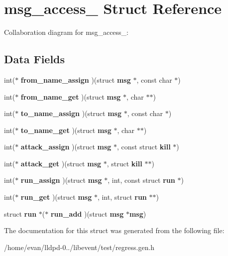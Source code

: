 \section{msg\-\_\-access\-\_\- \-Struct \-Reference}
\label{structmsg__access__}


\-Collaboration diagram for msg\-\_\-access\-\_\-\-:
\subsection*{\-Data \-Fields}
\begin{DoxyCompactItemize}
\item 
int($\ast$ {\bfseries from\-\_\-name\-\_\-assign} )(struct {\bf msg} $\ast$, const char $\ast$)\label{structmsg__access___aab24d16a38b390a7a0224426d52d34a1}

\item 
int($\ast$ {\bfseries from\-\_\-name\-\_\-get} )(struct {\bf msg} $\ast$, char $\ast$$\ast$)\label{structmsg__access___ad7114106088eb845e5763b3dbd6a34c2}

\item 
int($\ast$ {\bfseries to\-\_\-name\-\_\-assign} )(struct {\bf msg} $\ast$, const char $\ast$)\label{structmsg__access___a19536e5d882645bf50e5f5e8e8317e50}

\item 
int($\ast$ {\bfseries to\-\_\-name\-\_\-get} )(struct {\bf msg} $\ast$, char $\ast$$\ast$)\label{structmsg__access___a631ef4a0d8b7b8229b86bdc87d2fd047}

\item 
int($\ast$ {\bfseries attack\-\_\-assign} )(struct {\bf msg} $\ast$, const struct {\bf kill} $\ast$)\label{structmsg__access___a17b61aad565d2b89a1b792f3585d8b1a}

\item 
int($\ast$ {\bfseries attack\-\_\-get} )(struct {\bf msg} $\ast$, struct {\bf kill} $\ast$$\ast$)\label{structmsg__access___aa5b4a1885a677a35a18978e7e6bde05f}

\item 
int($\ast$ {\bfseries run\-\_\-assign} )(struct {\bf msg} $\ast$, int, const struct {\bf run} $\ast$)\label{structmsg__access___a6f70b038d4466bfd6fa194d4d5a8ba3e}

\item 
int($\ast$ {\bfseries run\-\_\-get} )(struct {\bf msg} $\ast$, int, struct {\bf run} $\ast$$\ast$)\label{structmsg__access___a4326da30c5e9a471ebc531e1933a6d46}

\item 
struct {\bf run} $\ast$($\ast$ {\bfseries run\-\_\-add} )(struct {\bf msg} $\ast${\bf msg})\label{structmsg__access___a02b96d1e805635422d9867cc32dd5132}

\end{DoxyCompactItemize}


\-The documentation for this struct was generated from the following file\-:\begin{DoxyCompactItemize}
\item 
/home/evan/lldpd-\/0../libevent/test/regress.\-gen.\-h\end{DoxyCompactItemize}

